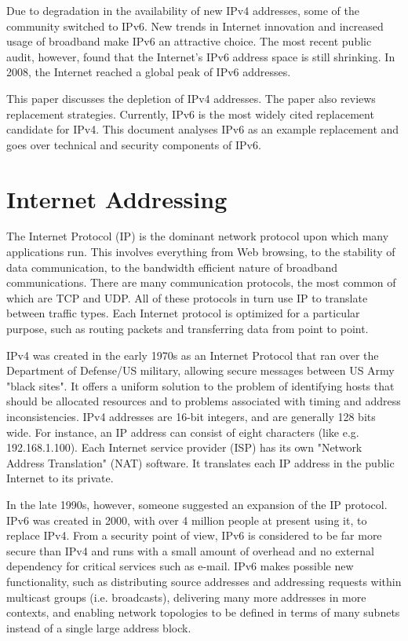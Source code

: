 \documentclass[conference]{IEEEtran}
\begin{document}
Due to degradation in the availability of new IPv4 addresses, some of the community switched to IPv6. New trends in Internet innovation and increased usage of broadband make IPv6 an attractive choice. The most recent public audit, however, found that the Internet's IPv6 address space is still shrinking. In 2008, the Internet reached a global peak of IPv6 addresses.

This paper discusses the depletion of IPv4 addresses. The paper also reviews replacement strategies. Currently, IPv6 is the most widely cited replacement candidate for IPv4. This document analyses IPv6 as an example replacement and goes over technical and security components of IPv6.

\section{Internet Addressing}
The Internet Protocol (IP) is the dominant network protocol upon which many applications run.  This involves everything from Web browsing, to the stability of data communication, to the bandwidth efficient nature of broadband communications. There are many communication protocols, the most common of which are TCP and UDP. All of these protocols in turn use IP to translate between traffic types. Each Internet protocol is optimized for a particular purpose, such as routing packets and transferring data from point to point.

IPv4  was created in the early 1970s as an Internet Protocol that ran over the Department of Defense/US military, allowing secure messages between US Army "black sites". It offers a uniform solution to the problem of identifying hosts that should be allocated resources and to problems associated with timing and address inconsistencies. IPv4 addresses are 16-bit integers, and are generally 128 bits wide. For instance, an IP address can consist of eight characters (like e.g. 192.168.1.100). Each Internet service provider (ISP) has its own "Network Address Translation" (NAT) software.  It translates each IP address in the public Internet to its private.

In the late 1990s, however, someone suggested an expansion of the IP protocol. IPv6  was created in 2000, with over 4 million people at present using it, to replace IPv4. From a security point of view, IPv6 is considered to be far more secure than IPv4 and runs with a small amount of overhead and no external dependency for critical services such as e-mail. IPv6 makes possible new functionality, such as distributing source addresses and addressing requests within multicast groups (i.e. broadcasts), delivering many more addresses in more contexts, and enabling network topologies to be defined in terms of many subnets instead of a single large address block.
\end{document}
